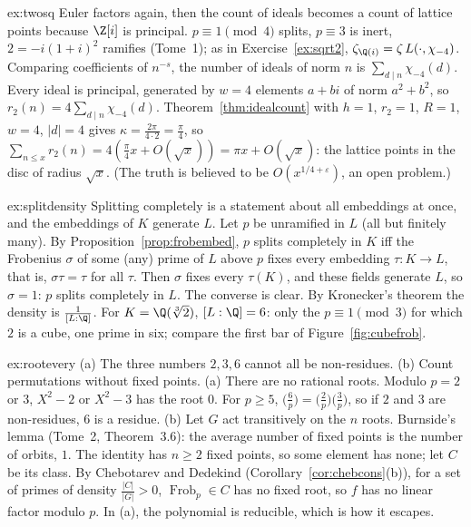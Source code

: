\begin{solution}{ex:twosq}
\idea Euler factors again, then the count of ideals becomes a count of lattice points because $\Z[i]$ is principal.
\writeup $p\equiv1\pmod4$ splits, $p\equiv3$ is inert, $2=-i(1+i)^2$ ramifies (Tome~1); as in Exercise~\ref{ex:sqrt2}, $\zeta_{\Q(i)}=\zeta\,L(\cdot,
\chi_{-4})$. Comparing coefficients of $n^{-s}$, the number of ideals of norm $n$ is $\sum_{d\mid n}\chi_{-4}(d)$. Every ideal is principal, generated
by $w=4$ elements $a+bi$ of norm $a^2+b^2$, so $r_2(n)=4\sum_{d\mid n}\chi_{-4}(d)$. Theorem~\ref{thm:idealcount} with $h=1$, $r_2=1$, $R=1$, $w=4$,
$|d|=4$ gives $\kappa=\frac{2\pi}{4\cdot2}=\frac\pi4$, so $\sum_{n\le x}r_2(n)=4(\frac\pi4x+O(\sqrt x))=\pi x+O(\sqrt x)$: the lattice points in the
disc of radius $\sqrt x$. (The truth is believed to be $O(x^{1/4+\varepsilon})$, an open problem.)
\end{solution}

\begin{solution}{ex:splitdensity}
\idea Splitting completely is a statement about all embeddings at once, and the embeddings of $K$ generate $L$.
\writeup Let $p$ be unramified in $L$ (all but finitely many). By Proposition~\ref{prop:frobembed}, $p$ splits completely in $K$ iff the Frobenius
$\sigma$ of some (any) prime of $L$ above $p$ fixes every embedding $\tau:K\to L$, that is, $\sigma\tau=\tau$ for all $\tau$. Then $\sigma$ fixes every
$\tau(K)$, and these fields generate $L$, so $\sigma=1$: $p$ splits completely in $L$. The converse is clear. By Kronecker's theorem the density is
$\frac1{[L:\Q]}$. For $K=\Q(\sqrt[3]2)$, $[L:\Q]=6$: only the $p\equiv1\pmod3$ for which $2$ is a cube, one prime in six; compare the first bar of
Figure~\ref{fig:cubefrob}.
\end{solution}

\begin{solution}{ex:rootevery}
\idea (a) The three numbers $2,3,6$ cannot all be non-residues. (b) Count permutations without fixed points.
\writeup (a) There are no rational roots. Modulo $p=2$ or $3$, $X^2-2$ or $X^2-3$ has the root $0$. For $p\ge5$, $\bigl(\frac6p\bigr)=\bigl(\frac2p\bigr)
\bigl(\frac3p\bigr)$, so if $2$ and $3$ are non-residues, $6$ is a residue. (b) Let $G$ act transitively on the $n$ roots. Burnside's lemma (Tome~2, Theorem~3.6):
the average number of fixed points is the number of orbits, $1$. The identity has $n\ge2$ fixed points, so some element has none; let $C$ be its class.
By Chebotarev and Dedekind (Corollary~\ref{cor:chebcons}(b)), for a set of primes of density $\frac{|C|}{|G|}>0$, $\operatorname{Frob}_p\in C$ has no
fixed root, so $f$ has no linear factor modulo $p$. In (a), the polynomial is reducible, which is how it escapes.
\end{solution}


